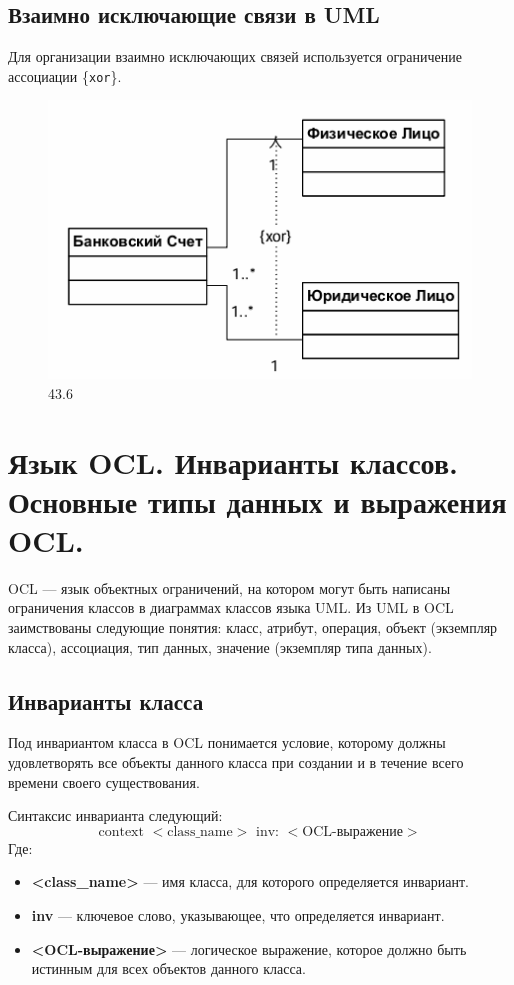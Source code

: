 \documentclass[a4paper,12pt]{article}
\begin{document}
\subsection{Взаимно исключающие связи в UML}

Для организации взаимно исключающих связей используется ограничение ассоциации \{\texttt{xor}\}.

\begin{center}
    \begin{figure}
        \centering
        \includegraphics[width=0.5\linewidth]{image4.png}
        \caption{43.6 }
        \label{fig:enter-label}
    \end{figure}
\end{center}

\section{Язык OCL. Инварианты классов. Основные типы данных и выражения OCL.}

OCL — язык объектных ограничений, на котором могут быть написаны ограничения классов в диаграммах классов языка UML. Из UML в OCL заимствованы следующие понятия: класс, атрибут, операция, объект (экземпляр класса), ассоциация, тип данных, значение (экземпляр типа данных).

\subsection{Инварианты класса}

Под инвариантом класса в OCL понимается условие, которому должны удовлетворять все объекты данного класса при создании и в течение всего времени своего существования.

Синтаксис инварианта следующий:
\[
\text{context } <\text{class\_name}> \text{ inv: } <\text{OCL-выражение}>
\]
Где:
\begin{itemize}
    \item \textbf{<class\_name>} — имя класса, для которого определяется инвариант.
    \item \textbf{inv} — ключевое слово, указывающее, что определяется инвариант.
    \item \textbf{<OCL-выражение>} — логическое выражение, которое должно быть истинным для всех объектов данного класса.
\end{itemize}
\end{document}
